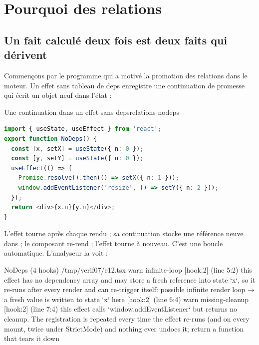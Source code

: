 \section{Pourquoi des relations}
\label{sec:relations-pourquoi}

\subsection{Un fait calculé deux fois est deux faits qui dérivent}

Commençons par le programme qui a motivé la promotion des relations dans le moteur. Un effet sans tableau de deps enregistre une continuation de promesse qui écrit un objet neuf dans l'état :

\begin{exemple}{Une continuation dans un effet sans deps}{relations-nodeps}
\begin{lstlisting}[language=TypeScript,caption={\file{/tmp/verif07/e12.tsx}},label={lst:relations-nodeps}]
import { useState, useEffect } from 'react';
export function NoDeps() {
  const [x, setX] = useState({ n: 0 });
  const [y, setY] = useState({ n: 0 });
  useEffect(() => {
    Promise.resolve().then(() => setX({ n: 1 }));
    window.addEventListener('resize', () => setY({ n: 2 }));
  });
  return <div>{x.n}{y.n}</div>;
}
\end{lstlisting}
L'effet tourne après chaque rendu ; sa continuation  stocke une référence neuve dans  ; le composant re-rend ; l'effet tourne à nouveau. C'est une boucle automatique. L'analyseur la voit :
\begin{sortie}
  NoDeps  (4 hooks)  /tmp/verif07/e12.tsx
    warn   infinite-loop  [hook:2]  (line 5:2)  this effect has no dependency array and may store a fresh reference into state `x`, so it re-runs after every render and can re-trigger itself: possible infinite render loop
       → a fresh value is written to state `x` here [hook:2] (line 6:4)
    warn   missing-cleanup  [hook:2]  (line 7:4)  this effect calls `window.addEventListener` but returns no cleanup. The registration is repeated every time the effect re-runs (and on every mount, twice under StrictMode) and nothing ever undoes it; return a function that tears it down
\end{sortie}
\end{exemple}

